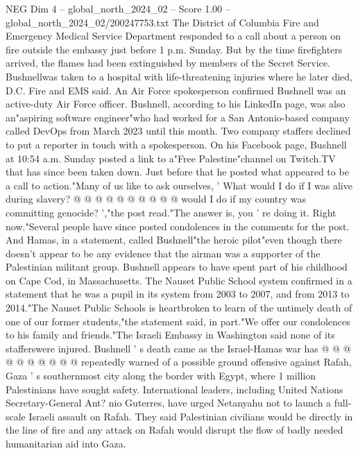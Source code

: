 \begin{textsample}{NEG Dim 4 – global\_north\_2024\_02 – Score 1.00 – global\_north\_2024\_02/200247753.txt}  \label{ex:f4_neg_280}
The District of Columbia Fire and Emergency Medical Service Department responded to a call about a person on fire outside the embassy just before 1 p.m.
Sunday.
But by the time firefighters arrived, the flames had been extinguished by members of the Secret Service.
Bushnellwas taken to a hospital with life-threatening injuries where he later died, D.C.
Fire and EMS said.
An Air Force spokesperson confirmed Bushnell was an active-duty Air Force officer.
Bushnell, according to his LinkedIn page, was also an"aspiring software engineer"who had worked for a San Antonio-based company called DevOps from March 2023 until this month.
Two company staffers declined to put a reporter in touch with a spokesperson.
On his Facebook page, Bushnell at 10:54 a.m.
Sunday posted a link to a"Free Palestine"channel on Twitch.TV that has since been taken down.
Just before that he posted what appeared to be a call to action."Many of us like to ask ourselves, ' What would I do if I was alive during slavery? @ @ @ @ @ @ @ @ @ @ would I do if my country was committing genocide? ',"the post read."The answer is, you ' re doing it.
Right now."Several people have since posted condolences in the comments for the post.
And Hamas, in a statement, called Bushnell"the heroic pilot"even though there doesn't appear to be any evidence that the airman was a supporter of the Palestinian militant group.
Bushnell appears to have spent part of his childhood on Cape Cod, in Massachusetts.
The Nauset Public School system confirmed in a statement that he was a pupil in its system from 2003 to 2007, and from 2013 to 2014."The Nauset Public Schools is heartbroken to learn of the untimely death of one of our former students,"the statement said, in part."We offer our condolences to his family and friends."The Israeli Embassy in Washington said none of its stafferswere injured.
Bushnell ' s death came as the Israel-Hamas war has @ @ @ @ @ @ @ @ @ @ repeatedly warned of a possible ground offensive against Rafah, Gaza ' s southernmost city along the border with Egypt, where 1 million Palestinians have sought safety.
International leaders, including United Nations Secretary-General Ant? nio Guterres, have urged Netanyahu not to launch a full-scale Israeli assault on Rafah.
They said Palestinian civilians would be directly in the line of fire and any attack on Rafah would disrupt the flow of badly needed humanitarian aid into Gaza.

\end{textsample}
